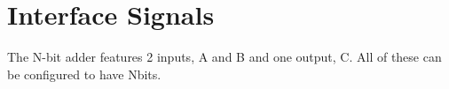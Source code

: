 \section{Interface Signals}
\label{sec:is}

The N-bit adder features 2 inputs, A and B and one output, C. All of these can be configured to have Nbits.
